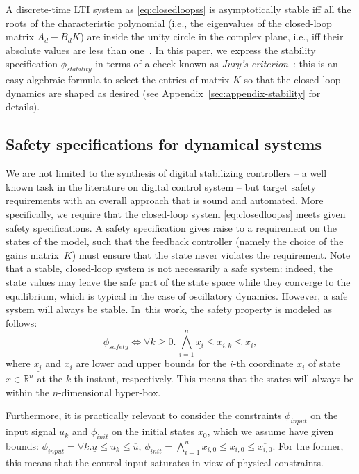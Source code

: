\documentclass[runningheads,a4paper]{llncs}
\newcommand{\addtodo}[1]{{\color{red} TODO: #1}}
\begin{document}
A discrete-time LTI system as \eqref{eq:closedloopss} is asymptotically
stable iff all the roots of the characteristic polynomial (i.e., the
eigenvalues of the closed-loop matrix $A_d - B_d K$) are inside the unity
circle in the complex plane, i.e., iff their absolute values are less than
one~\cite{astrom1997computer}.  In this paper, we express the stability
specification $\phi_\mathit{stability}$ in terms of a check known as
\emph{Jury's criterion}~\cite{fadali}: this is an easy algebraic formula to
select the entries of matrix $K$ so that the closed-loop dynamics are shaped
as desired (see Appendix~\ref{sec:appendix-stability} for details).

\subsection{Safety specifications for dynamical systems}
\label{ssec:safety}

We are not limited to the synthesis of digital stabilizing controllers -- a
well known task in the literature on digital control system -- but target
safety requirements with an overall approach that is sound and automated. 
More specifically, we require that the closed-loop system
\eqref{eq:closedloopss} meets given safety specifications.  A safety
specification gives raise to a requirement on the states of the model, such
that the feedback controller (namely the choice of the gains matrix~$K$)
must ensure that the state never violates the requirement.  Note that a
stable, closed-loop system is not necessarily a safe system: indeed, the
state values may leave the safe part of the state space while they converge
to the equilibrium, which is typical in the case of oscillatory dynamics. 
However, a safe system will always be stable.  In~this work, the safety
property is modeled as follows:
%
\begin{equation}
\label{eq:safetyliteral}
\phi_\mathit{safety}\iff \forall k\ge 0.\, \bigwedge_{i=1}^{n}{\underline{x_{i}} \leq x_{i,k} \leq \overline{x_{i}}},
\end{equation}
%
%
where $\underline{x_{i}}$ and $\overline{x_{i}}$ are lower and upper bounds
for the $i$-th coordinate $x_{i}$ of state $x\in \mathbb R^n$ at the $k$-th
instant, respectively.  This means that the states will always be within the
$n$-dimensional hyper-box.

Furthermore, it is practically relevant to consider the 
constraints $\phi_\mathit{input}$ on the input
signal $u_{k}$ and $\phi_\mathit{init}$ on the initial states $x_0$,
which we assume have given bounds:
$\phi_\mathit{input} = {\forall k.\underline{u} \leq u_{k} \leq \overline{u}} $, 
$\phi_\mathit{init} = \bigwedge_{i=1}^{n} \underline{x_{i,0}} \leq x_{i,0} \leq \overline{x_{i,0}}.$
For the former, this means that the control input saturates in view of
physical constraints.
\end{document}
